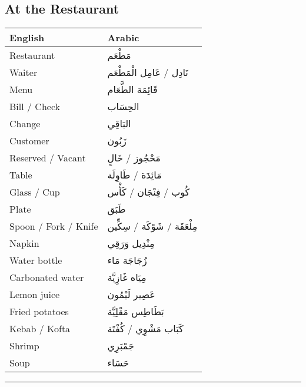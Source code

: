 \documentclass[
  a4paper,
  DIV=11,
  numbers=noendperiod]{scrartcl}
\begin{document}
\subsection{At the Restaurant}\label{at-the-restaurant}

\begin{longtable}[]{@{}ll@{}}
\toprule\noalign{}
English & Arabic \\
\midrule\noalign{}
\endhead
\bottomrule\noalign{}
\endlastfoot
Restaurant & مَطْعَم \\
Waiter & نَادِل / عَامِل الْمَطْعَم \\
Menu & قَائِمَة الطَّعَام \\
Bill / Check & الحِسَاب \\
Change & البَاقِي \\
Customer & زَبُون \\
Reserved / Vacant & مَحْجُوز / خَالٍ \\
Table & مَائِدَة / طَاوِلَة \\
Glass / Cup & كُوب / فِنْجَان / كَأْس \\
Plate & طَبَق \\
Spoon / Fork / Knife & مِلْعَقَة / شَوْكَة / سِكِّين \\
Napkin & مِنْدِيل وَرَقِي \\
Water bottle & زُجَاجَة مَاء \\
Carbonated water & مِيَاه غَازِيَّة \\
Lemon juice & عَصِير لَيْمُون \\
Fried potatoes & بَطَاطِس مَقْلِيَّة \\
Kebab / Kofta & كَبَاب مَشْوِي / كُفْتَة \\
Shrimp & جَمْبَرِي \\
Soup & حَسَاء \\
\end{longtable}

\begin{center}\rule{0.5\linewidth}{0.5pt}\end{center}
\end{document}
